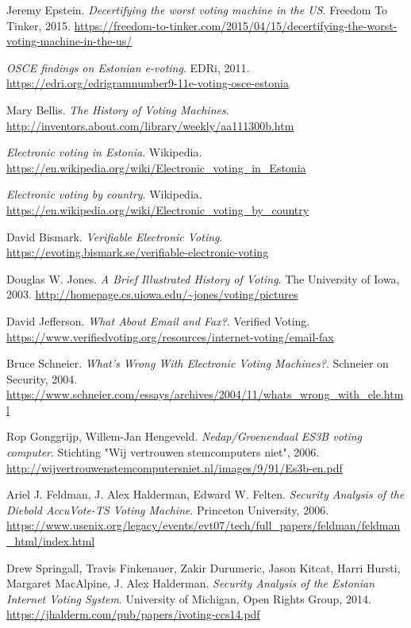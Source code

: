 \documentclass[polish]{kbk}
\begin{document}
\begin{thebibliography}{9}

  Jeremy Epstein.
  \emph{Decertifying the worst voting machine in the US}.
  Freedom To Tinker, 2015.
  \url{https://freedom-to-tinker.com/2015/04/15/decertifying-the-worst-voting-machine-in-the-us/}
  
  \emph{OSCE findings on Estonian e-voting}.
  EDRi, 2011.
  \url{https://edri.org/edrigramnumber9-11e-voting-osce-estonia}
  
  Mary Bellis.
  \emph{The History of Voting Machines}.
  \url{http://inventors.about.com/library/weekly/aa111300b.htm}
  
  \emph{Electronic voting in Estonia}.
  Wikipedia.
  \url{https://en.wikipedia.org/wiki/Electronic_voting_in_Estonia}
  
  \emph{Electronic voting by country}.
  Wikipedia.
  \url{https://en.wikipedia.org/wiki/Electronic_voting_by_country}
  
  David Bismark.
  \emph{Verifiable Electronic Voting}.
  \url{https://evoting.bismark.se/verifiable-electronic-voting}
  
  Douglas W. Jones.
  \emph{A Brief Illustrated History of Voting}.
  The University of Iowa, 2003.
  \url{http://homepage.cs.uiowa.edu/~jones/voting/pictures}
  
  David Jefferson.
  \emph{What About Email and Fax?}.
  Verified Voting.
  \url{https://www.verifiedvoting.org/resources/internet-voting/email-fax}
  
  Bruce Schneier.
  \emph{What's Wrong With Electronic Voting Machines?}.
  Schneier on Security, 2004.
  \url{https://www.schneier.com/essays/archives/2004/11/whats_wrong_with_ele.html}
  
  Rop Gonggrijp, Willem-Jan Hengeveld.
  \emph{Nedap/Groenendaal ES3B voting computer}.
  Stichting "Wij vertrouwen stemcomputers niet", 2006.
  \url{http://wijvertrouwenstemcomputersniet.nl/images/9/91/Es3b-en.pdf}
  
  Ariel J. Feldman, J. Alex Halderman, Edward W. Felten.
  \emph{Security Analysis of the Diebold AccuVote-TS Voting Machine}.
  Princeton University, 2006.
  \url{https://www.usenix.org/legacy/events/evt07/tech/full_papers/feldman/feldman_html/index.html}
  
  Drew Springall, Travis Finkenauer, Zakir Durumeric, Jason Kitcat, Harri Hursti, Margaret MacAlpine, J. Alex Halderman.
  \emph{Security Analysis of the Estonian Internet Voting System}.
  University of Michigan, Open Rights Group, 2014.
  \url{https://jhalderm.com/pub/papers/ivoting-ccs14.pdf}
  

\end{thebibliography}
\end{document}
